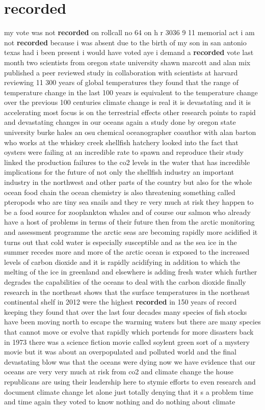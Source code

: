 \documentclass{article}
\begin{document}
\section*{recorded}
my vote was not {\bf \color{red} recorded} on rollcall no 64 on h r 3036 9 11 memorial act i am not {\bf \color{red} recorded} because i was absent due to the birth of my son in san antonio texas had i been present i would have voted aye
\vspace{8mm}
i demand a {\bf \color{red} recorded} vote
\vspace{8mm}
last month two scientists from oregon state university shawn marcott and alan mix published a peer reviewed study in collaboration with scientists at harvard reviewing 11 300 years of global temperatures they found that the range of temperature change in the last 100 years is equivalent to the temperature change over the previous 100 centuries climate change is real it is devastating and it is accelerating most focus is on the terrestrial effects other research points to rapid and devastating changes in our oceans again a study done by oregon state university burke hales an osu chemical oceanographer coauthor with alan barton who works at the whiskey creek shellfish hatchery looked into the fact that oysters were failing at an incredible rate to spawn and reproduce their study linked the production failures to the co2 levels in the water that has incredible implications for the future of not only the shellfish industry an important industry in the northwest and other parts of the country but also for the whole ocean food chain the ocean chemistry is also threatening something called pteropods who are tiny sea snails and they re very much at risk they happen to be a food source for zooplankton whales and of course our salmon who already have a host of problems in terms of their future then from the arctic monitoring and assessment programme the arctic seas are becoming rapidly more acidified it turns out that cold water is especially susceptible and as the sea ice in the summer recedes more and more of the arctic ocean is exposed to the increased levels of carbon dioxide and it is rapidly acidifying in addition to which the melting of the ice in greenland and elsewhere is adding fresh water which further degrades the capabilities of the oceans to deal with the carbon dioxide finally research in the northeast shows that the surface temperatures in the northeast continental shelf in 2012 were the highest {\bf \color{red} recorded} in 150 years of record keeping they found that over the last four decades many species of fish stocks have been moving north to escape the warming waters but there are many species that cannot move or evolve that rapidly which portends for more disasters back in 1973 there was a science fiction movie called soylent green sort of a mystery movie but it was about an overpopulated and polluted world and the final devastating blow was that the oceans were dying now we have evidence that our oceans are very very much at risk from co2 and climate change the house republicans are using their leadership here to stymie efforts to even research and document climate change let alone just totally denying that it s a problem time and time again they voted to know nothing and do nothing about climate 
\end{document}
